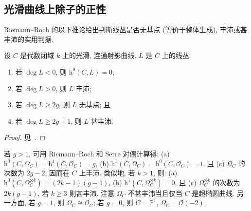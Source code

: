 \subsection{光滑曲线上除子的正性}\label{src:6.1.3-subsection}
Riemann--Roch 的以下推论给出判断线丛是否无基点 (等价于整体生成), 丰沛或甚丰沛的实用判据.
\begin{corollary}\label{src:6.1.11}
设 $C$ 是代数闭域 $k$ 上的光滑, 连通射影曲线, $L$ 是 $C$ 上的线丛.
\begin{enumerate}[(1)]
\item 若 $\deg L<0$, 则 $\mathrm h^0(C,\allowbreak L)=0$;
\item 若 $\deg L>0$, 则 $L$ 丰沛;
\item 若 $\deg L\geq2g$, 则 $L$ 无基点; 且
\item 若 $\deg L\geq2g+1$, 则 $L$ 甚丰沛.
\end{enumerate}
\end{corollary}
\begin{proof}
见~\cite[推论 IV.3.2]{Har77}.
\end{proof}
\begin{remark}\label{src:6.1.12}
若 $g>1$, 可用 Riemann--Roch 和 Serre 对偶计算得: (a) $\mathrm h^0(C,\allowbreak \Omega_C)=\mathrm h^1(C,\allowbreak \mathcal O_C)=g$, (b) $\mathrm h^1(C,\allowbreak \Omega_C)=\mathrm h^0(C,\allowbreak \mathcal O_C)=1$, 且 (c) $\Omega_C$ 的次数为 $2g-2$, 因而在 $C$ 上丰沛. 类似地, 若 $k>1$, 则: (a) $\mathrm h^0(C,\allowbreak \Omega_C^{\otimes k})=(2k-1)(g-1)$, (b) $\mathrm h^1(C,\allowbreak \Omega_C^{\otimes k})=0$, 且 (c) $\Omega_C^{\otimes k}$ 的次数为 $2k(g-1)$, 若 $k\geq3$ 则甚丰沛. 注意 $\Omega_C$ 不甚丰沛当且仅当 $C$ 是超椭圆曲线. 另一方面, 若 $g=1$, 则 $\Omega_C\cong\mathcal O_C$; 若 $g=0$, 则 $C=\mathbb P^1$, $\Omega_C=\mathcal O(-2)$.
\end{remark}
